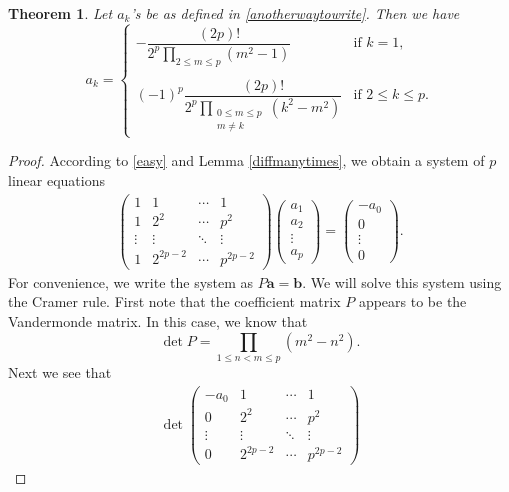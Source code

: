 \documentclass[12pt, reqno]{amsart}
\theoremstyle{plain}
\newtheorem{theorem}{Theorem}[section]
\theoremstyle{definition}
\begin{document}
\begin{theorem}\label{rmk5.3}
    Let $a_k$'s be as defined in \eqref{anotherwaytowrite}. Then we have
     \[a_k=\begin{cases}
			-\dfrac{(2p)!}{2^p\displaystyle\prod_{2\le m\le p}(m^2-1)}&\text{if }k=1,\\
			\\
			(-1)^p\dfrac{(2p)!}{2^p\displaystyle\prod_{\substack{0\leq m\leq p\\m\neq k}}(k^2-m^2)}&\text{if }2\leq k\leq p.
		\end{cases}\]
\end{theorem}
\begin{proof}
    According to \eqref{easy} and Lemma \ref{diffmanytimes}, we obtain a system of $p$ linear equations
    \begin{align*}
        \begin{pmatrix}
            1 & 1 & \cdots & 1\\
            1 & 2^2 & \cdots & p^2\\
            \vdots & \vdots & \ddots & \vdots\\
            1 & 2^{2p-2} & \cdots & p^{2p-2}
        \end{pmatrix}
        \begin{pmatrix}
            a_1 \\ a_2 \\ \vdots \\ a_p
        \end{pmatrix}=\begin{pmatrix}
            -a_0 \\ 0 \\ \vdots \\ 0
        \end{pmatrix}.
    \end{align*}
    For convenience, we write the system as $P\mathbf{a}=\mathbf{b}$. We will solve this system using the Cramer rule. First note that the coefficient matrix $P$ appears to be the Vandermonde matrix. In this case, we know that
    \[\det P=\prod_{1\le n<m\le p}(m^2-n^2).\]
    Next we see that
    \begin{align*}
        \det\begin{pmatrix}
            -a_0 & 1 & \cdots & 1\\
            0 & 2^2 & \cdots & p^2\\
            \vdots & \vdots & \ddots & \vdots\\
            0 & 2^{2p-2} & \cdots & p^{2p-2}
        \end{pmatrix}

\end{align*}
\end{proof}
\end{document}
